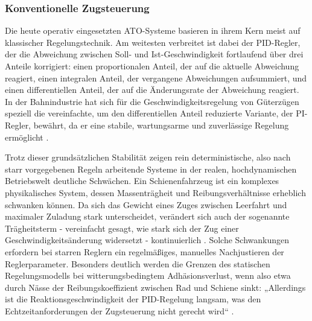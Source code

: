 \subsubsection{Konventionelle Zugsteuerung}

Die heute operativ eingesetzten \gls{ATO}-Systeme basieren in ihrem Kern meist auf klassischer Regelungstechnik. Am weitesten verbreitet ist dabei der \gls{PID}-Regler, der die Abweichung zwischen Soll- und Ist-Geschwindigkeit fortlaufend über drei Anteile korrigiert: einen proportionalen Anteil, der auf die aktuelle Abweichung reagiert, einen integralen Anteil, der vergangene Abweichungen aufsummiert, und einen differentiellen Anteil, der auf die Änderungsrate der Abweichung reagiert. In der Bahnindustrie hat sich für die Geschwindigkeitsregelung von Güterzügen speziell die vereinfachte, um den differentiellen Anteil reduzierte Variante, der \gls{PI}-Regler, bewährt, da er eine stabile, wartungsarme und zuverlässige Regelung ermöglicht \cite[vgl.~S.~41]{chap3_Faz25}.

Trotz dieser grundsätzlichen Stabilität zeigen rein deterministische, also nach starr vorgegebenen Regeln arbeitende Systeme in der realen, hochdynamischen Betriebswelt deutliche Schwächen. Ein Schienenfahrzeug ist ein komplexes physikalisches System, dessen Massenträgheit und Reibungsverhältnisse erheblich schwanken können. Da sich das Gewicht eines Zuges zwischen Leerfahrt und maximaler Zuladung stark unterscheidet, verändert sich auch der sogenannte Trägheitsterm - vereinfacht gesagt, wie stark sich der Zug einer Geschwindigkeitsänderung widersetzt - kontinuierlich \cite[vgl.~S.~17ff.]{chap3_Yue23}. Solche Schwankungen erfordern bei starren Reglern ein regelmäßiges, manuelles Nachjustieren der Reglerparameter. Besonders deutlich werden die Grenzen des statischen Regelungsmodells bei witterungsbedingtem Adhäsionsverlust, wenn also etwa durch Nässe der Reibungskoeffizient zwischen Rad und Schiene sinkt: „Allerdings ist die Reaktionsgeschwindigkeit der \gls{PID}-Regelung langsam, was den Echtzeitanforderungen der Zugsteuerung nicht gerecht wird“ \cite[S.~1]{chap3_Yan21}.

